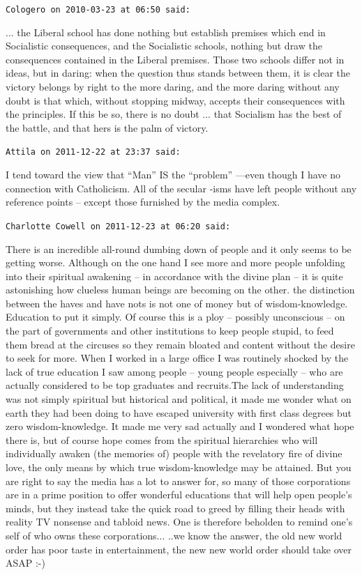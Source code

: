 \begin{footnotesize}
\begin{sffamily}
\texttt{Cologero on 2010-03-23 at 06:50 said:}

... the Liberal school has done nothing but establish premises which end in Socialistic consequences, and the Socialistic schools, nothing but draw the consequences contained in the Liberal premises. Those two schools differ not in ideas, but in daring: when the question thus stands between them, it is clear the victory belongs by right to the more daring, and the more daring without any doubt is that which, without stopping midway, accepts their consequences with the principles. If this be so, there is no doubt ... that Socialism has the best of the battle, and that hers is the palm of victory.


\hfill

\texttt{Attila on 2011-12-22 at 23:37 said:}

I tend toward the view that ``Man'' IS the ``problem'' ---even though I have no connection with Catholicism. All of the secular -isms have left people without any reference points -- except those furnished by the media complex.

\hfill

\texttt{Charlotte Cowell on 2011-12-23 at 06:20 said:}

There is an incredible all-round dumbing down of people and it only seems to be getting worse. Although on the one hand I see more and more people unfolding into their spiritual awakening -- in accordance with the divine plan -- it is quite astonishing how clueless human beings are becoming on the other. the distinction between the haves and have nots is not one of money but of wisdom-knowledge. Education to put it simply. Of course this is a ploy -- possibly unconscious -- on the part of governments and other institutions to keep people stupid, to feed them bread at the circuses so they remain bloated and content without the desire to seek for more. When I worked in a large office I was routinely shocked by the lack of true education I saw among people -- young people especially -- who are actually considered to be top graduates and recruits.The lack of understanding was not simply spiritual but historical and political, it made me wonder what on earth they had been doing to have escaped university with first class degrees but zero wisdom-knowledge. It made me very sad actually and I wondered what hope there is, but of course hope comes from the spiritual hierarchies who will individually awaken (the memories of) people with the revelatory fire of divine love, the only means by which true wisdom-knowledge may be attained. But you are right to say the media has a lot to answer for, so many of those corporations are in a prime position to offer wonderful educations that will help open people's minds, but they instead take the quick road to greed by filling their heads with reality TV nonsense and tabloid news. One is therefore beholden to remind one's self of who owns these corporations... ..we know the answer, the old new world order has poor taste in entertainment, the new new world order should take over ASAP :-)


\end{sffamily}
\end{footnotesize}
